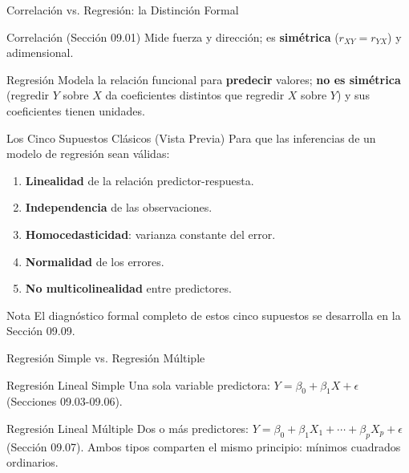 \documentclass[10pt, aspectratio=169]{beamer}
\begin{document}
\begin{frame}{Correlación vs. Regresión: la Distinción Formal}
  \footnotesize
  \begin{block}{Correlación (Sección 09.01)}
    Mide fuerza y dirección; es \textbf{simétrica} ($r_{XY}=r_{YX}$) y adimensional.
  \end{block}
  \pause

  \vspace{0.1cm}
  \begin{alertblock}{Regresión}
    Modela la relación funcional para \textbf{predecir} valores; \textbf{no es simétrica} (regredir $Y$ sobre $X$ da coeficientes distintos que regredir $X$ sobre $Y$) y sus coeficientes tienen unidades.
  \end{alertblock}
\end{frame}

\begin{frame}{Los Cinco Supuestos Clásicos (Vista Previa)}
  \footnotesize
  Para que las inferencias de un modelo de regresión sean válidas:
  \begin{enumerate}\itemsep=0.06cm
    \item \textbf{Linealidad} de la relación predictor-respuesta. \pause
    \item \textbf{Independencia} de las observaciones. \pause
    \item \textbf{Homocedasticidad}: varianza constante del error. \pause
    \item \textbf{Normalidad} de los errores. \pause
    \item \textbf{No multicolinealidad} entre predictores.
  \end{enumerate}
  \vspace{0.05cm}
  \begin{alertblock}{Nota}
    El diagnóstico formal completo de estos cinco supuestos se desarrolla en la Sección 09.09.
  \end{alertblock}
\end{frame}

\begin{frame}{Regresión Simple vs. Regresión Múltiple}
  \footnotesize
  \begin{block}{Regresión Lineal Simple}
    Una sola variable predictora: $Y=\beta_0+\beta_1X+\epsilon$ (Secciones 09.03-09.06).
  \end{block}
  \pause

  \vspace{0.1cm}
  \begin{alertblock}{Regresión Lineal Múltiple}
    Dos o más predictores: $Y=\beta_0+\beta_1X_1+\cdots+\beta_pX_p+\epsilon$ (Sección 09.07). Ambos tipos comparten el mismo principio: mínimos cuadrados ordinarios.
  \end{alertblock}
\end{frame}
\end{document}
